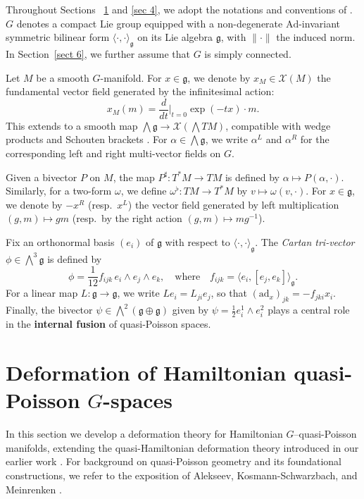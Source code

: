 \documentclass[reqno]{amsart}
\theoremstyle{plain}
\theoremstyle{definition}
\begin{document}
Throughout Sections ~\ref{sec 2} and \ref{sec 4}, we adopt the notations and conventions of \cite{alekseev2002quasi}. $G$ denotes a compact Lie group equipped with a non-degenerate $\mathrm{Ad}$-invariant symmetric bilinear form $\langle \cdot, \cdot\rangle_{\mathfrak{g}}$ on its Lie algebra $\mathfrak{g}$, with $\|\cdot\|$ the induced norm. In Section~\ref{sect 6}, we further assume that $G$ is simply connected.

Let $M$ be a smooth $G$-manifold. For $x \in \mathfrak{g}$, we denote by $x_{M} \in \mathcal{X}(M)$ the fundamental vector field generated by the infinitesimal action:
\[
x_{M}(m) = \frac{d}{dt}\Big|_{t=0}\exp(-tx)\cdot m.
\]
This extends to a smooth map $\bigwedge \mathfrak{g} \to \mathcal{X}(\bigwedge TM)$, compatible with wedge products and Schouten brackets \cite[Section~1]{alekseev2002quasi}. For $\alpha \in \bigwedge \mathfrak{g}$, we write $\alpha^L$ and $\alpha^R$ for the corresponding left and right multi-vector fields on $G$.

Given a bivector $P$ on $M$, the map $P^{\sharp}: T^{*}M \to TM$ is defined by $\alpha \mapsto P(\alpha,\cdot)$. Similarly, for a two-form $\omega$, we define $\omega^{\flat}: TM \to T^{*}M$ by $v \mapsto \omega(v,\cdot)$. For $x \in \mathfrak{g}$, we denote by $-x^{R}$ (resp.\ $x^{L}$) the vector field generated by left multiplication $(g,m) \mapsto gm$ (resp.\ by the right action $(g,m) \mapsto mg^{-1}$).

Fix an orthonormal basis $(e_{i})$ of $\mathfrak{g}$ with respect to $\langle\cdot,\cdot\rangle_{\mathfrak{g}}$. The \emph{Cartan tri-vector} $\phi \in \bigwedge^3 \mathfrak{g}$ is defined by
\[
\phi = \frac{1}{12} f_{ijk}\, e_{i}\wedge e_{j}\wedge e_{k}, \quad \text{where} \quad f_{ijk} = \langle e_{i}, [e_{j},e_{k}] \rangle_{\mathfrak{g}}.
\]
For a linear map $L: \mathfrak{g} \to \mathfrak{g}$, we write $Le_{i} = L_{ji}e_{j}$, so that $(\mathrm{ad}_{x})_{jk} = -f_{jki}x_{i}$. Finally, the bivector $\psi \in \bigwedge^{2}(\mathfrak{g} \oplus \mathfrak{g})$ given by $\psi = \frac{1}{2}e_{i}^{1}\wedge e_{i}^{2}$ plays a central role in the \textbf{internal fusion} of quasi-Poisson spaces.






\section{Deformation of Hamiltonian quasi-Poisson $G$-spaces} \label{sec 2}
In this section we develop a deformation theory for Hamiltonian $G${--}quasi-Poisson manifolds, extending the quasi-Hamiltonian deformation theory introduced in our earlier work \cite{JMM2025deformations}. For background on quasi-Poisson geometry and its foundational constructions, we refer to the exposition of Alekseev, Kosmann-Schwarzbach, and Meinrenken \cite{alekseev2002quasi}.
\end{document}
